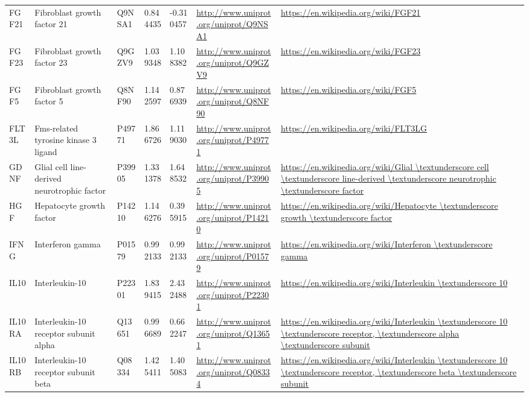 \begin{table}[H]
{\begin{tabular}{ lllllll }
        \multicolumn{1}{l|}{ FGF21 } &  Fibroblast growth factor 21   & Q9NSA1   & 0.844435   & -0.310457   & \url{http://www.uniprot.org/uniprot/Q9NSA1}   & \url{https://en.wikipedia.org/wiki/FGF21}          \\ 
        \multicolumn{1}{l|}{ FGF23 } &  Fibroblast growth factor 23   & Q9GZV9   & 1.039348   & 1.108382   & \url{http://www.uniprot.org/uniprot/Q9GZV9}   & \url{https://en.wikipedia.org/wiki/FGF23}          \\ 
        \multicolumn{1}{l|}{ FGF5 } &  Fibroblast growth factor 5   & Q8NF90   & 1.142597   & 0.876939   & \url{http://www.uniprot.org/uniprot/Q8NF90}   & \url{https://en.wikipedia.org/wiki/FGF5}          \\ 
        \multicolumn{1}{l|}{ FLT3L } &  Fms-related tyrosine kinase 3 ligand   & P49771   & 1.866726   & 1.119030   & \url{http://www.uniprot.org/uniprot/P49771}   & \url{https://en.wikipedia.org/wiki/FLT3LG}          \\ 
        \multicolumn{1}{l|}{ GDNF } &  Glial cell line-derived neurotrophic factor   & P39905   & 1.331378   & 1.648532   & \url{http://www.uniprot.org/uniprot/P39905}   & \url{https://en.wikipedia.org/wiki/Glial \textunderscore cell \textunderscore line-derived \textunderscore neurotrophic \textunderscore factor}          \\ 
        \multicolumn{1}{l|}{ HGF } &  Hepatocyte growth factor   & P14210   & 1.146276   & 0.395915   & \url{http://www.uniprot.org/uniprot/P14210}   & \url{https://en.wikipedia.org/wiki/Hepatocyte \textunderscore growth \textunderscore factor}          \\ 
        \multicolumn{1}{l|}{ IFNG } &  Interferon gamma   & P01579   & 0.992133   & 0.992133   & \url{http://www.uniprot.org/uniprot/P01579}   & \url{https://en.wikipedia.org/wiki/Interferon \textunderscore gamma}          \\ 
        \multicolumn{1}{l|}{ IL10 } &  Interleukin-10   & P22301   & 1.839415   & 2.432488   & \url{http://www.uniprot.org/uniprot/P22301}   & \url{https://en.wikipedia.org/wiki/Interleukin \textunderscore 10}          \\ 
        \multicolumn{1}{l|}{ IL10RA } &  Interleukin-10 receptor subunit alpha   & Q13651   & 0.996689   & 0.662247   & \url{http://www.uniprot.org/uniprot/Q13651}   & \url{https://en.wikipedia.org/wiki/Interleukin \textunderscore 10 \textunderscore receptor, \textunderscore alpha \textunderscore subunit}          \\ 
        \multicolumn{1}{l|}{ IL10RB } &  Interleukin-10 receptor subunit beta   & Q08334   & 1.425411   & 1.405083   & \url{http://www.uniprot.org/uniprot/Q08334}   & \url{https://en.wikipedia.org/wiki/Interleukin \textunderscore 10 \textunderscore receptor, \textunderscore beta \textunderscore subunit}          \\ 

\end{tabular}}
\end{table}
